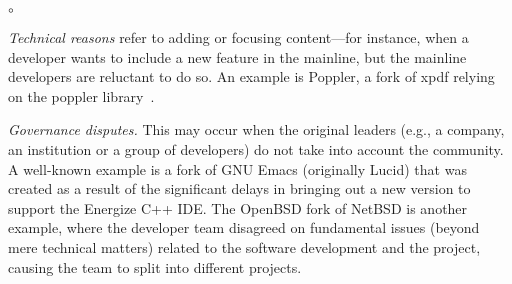 
\begin{list}{$\circ$}{}
   \item \textit{Technical reasons} refer to adding or focusing content---for instance, when a developer wants to include a new feature in the mainline, but the mainline developers are reluctant to do so. An example is \textsf{Poppler}, a fork of \textsf{xpdf} relying on the \textsf{poppler} library~\cite{Gregorio:2012}.

    \item \textit{Governance disputes.} This may occur when the original leaders (e.g., a company, an institution or a group of developers) do not take into account the community. A well-known example is a fork of \textsf{GNU Emacs} (originally \textsf{Lucid}) that was created as a result of the significant delays in bringing out a new version to support the Energize C++ IDE. The \textsf{OpenBSD} fork of \textsf{NetBSD} is another example, where the developer team disagreed on fundamental issues (beyond mere technical matters) related to the software development and the project, causing the team to split into different projects. %





\end{list}
